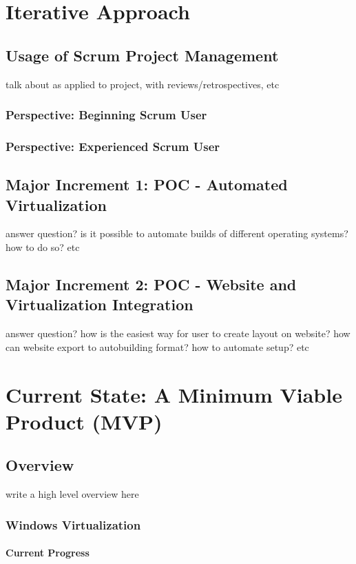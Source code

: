 \documentclass[openright]{report}
\begin{document}
\chapter{Iterative Approach}

\section{Usage of Scrum Project Management}
talk about as applied to project, with reviews/retrospectives, etc

\subsection{Perspective: Beginning Scrum User}

\subsection{Perspective: Experienced Scrum User}

\section{Major Increment 1: POC - Automated Virtualization}
answer question? is it possible to automate builds of different operating systems? how to do so? etc

\section{Major Increment 2: POC -  Website and Virtualization Integration}
answer question? how is the easiest way for user to create layout on website? how can website export to autobuilding format? how to automate setup? etc

\chapter{Current State: A Minimum Viable Product (MVP)}

\section{Overview}
write a high level overview here

\subsection{Windows Virtualization}

\subsubsection{Current Progress}
\end{document}
